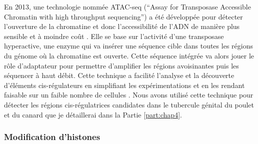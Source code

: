 En 2013, une technologie nommée ATAC-seq (“Assay for Transposase Accessible Chromatin with high throughput sequencing”) a été développée pour détecter l’ouverture de la chromatine et donc l’accessibilité de l’ADN de manière plus sensible et à moindre coût \citep{buenrostro_transposition_2013}. Elle se base sur l’activité d’une transposase hyperactive, une enzyme qui va insérer une séquence cible dans toutes les régions du génome où la chromatine est ouverte. Cette séquence intégrée va alors jouer le rôle d'adaptateur pour permettre d’amplifier les régions avoisinantes puis les séquencer à haut débit. Cette technique a facilité l’analyse et la découverte d’éléments \gls{cis}-régulateurs en simplifiant les expérimentations et en les rendant faisable sur un faible nombre de cellules \citep{daugherty_chromatin_2017}. Nous avons utilisé cette technique pour détecter les régions \gls{cis}-régulatrices candidates dans le tubercule génital du poulet et du canard que je détaillerai dans la Partie \ref{part:chap4}. 

\subsubsection{Modification d’histones}
\label{subsubsec:histone}


